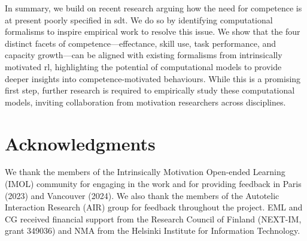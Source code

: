 \documentclass[10pt,letterpaper]{article}
\begin{document}
In summary, we build on recent research arguing how the need for competence is at present poorly specified in \gls{sdt}. We do so by identifying computational formalisms to inspire empirical work to resolve this issue. We show that the four distinct facets of competence---effectance, skill use, task performance, and capacity growth---can be aligned with existing formalisms from intrinsically motivated \gls{rl}, highlighting the potential of computational models to provide deeper insights into competence-motivated behaviours. While this is a promising first step, further research is required to empirically study these computational models, inviting collaboration from motivation researchers across disciplines.



\section{Acknowledgments}

We thank the members of the Intrinsically Motivation Open-ended Learning (IMOL) community for engaging in the work and for providing feedback in Paris (2023) and Vancouver (2024). We also thank the members of the Autotelic Interaction Research (AIR) group for feedback throughout the project. EML and CG received financial support from the Research Council of Finland (NEXT-IM, grant 349036) and NMA from the Helsinki Institute for Information Technology.



\setlength{\bibleftmargin}{.125in}
\setlength{\bibindent}{-\bibleftmargin}

\end{document}
